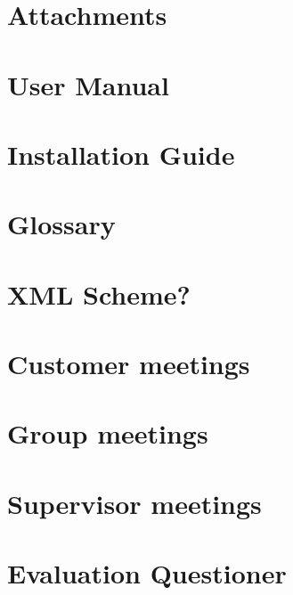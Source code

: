 \documentclass{report}
\begin{document}
\chapter{Attachments}


\appendix
\chapter{User Manual}
\chapter{Installation Guide}
\chapter{Glossary}
\chapter{XML Scheme?}
\chapter{Customer meetings}
\chapter{Group meetings}
\chapter{Supervisor meetings}
\chapter{Evaluation Questioner}

%
\end{document}
